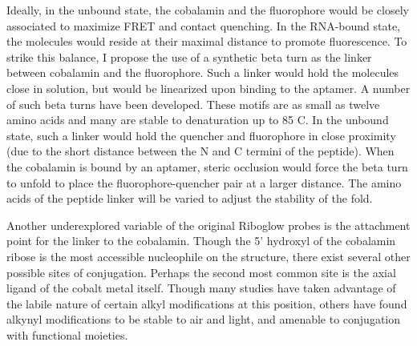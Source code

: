 Ideally, in the unbound state, the cobalamin and the fluorophore would be closely associated to maximize FRET and contact quenching.\cite{LeeDesignSynthesisCharacterization2009} In the RNA-bound state, the molecules would reside at their maximal distance to promote fluorescence. To strike this balance, I propose the use of a synthetic beta turn as the linker between cobalamin and the fluorophore. Such a linker would hold the molecules close in solution, but would be linearized upon binding to the aptamer. A number of such beta turns have been developed. These motifs are as small as twelve amino acids and many are stable to denaturation up to 85 C.\cite{KierProbingLowerSize2008} In the unbound state, such a linker would hold the quencher and fluorophore in close proximity (due to the short distance between the N and C termini of the peptide). When the cobalamin is bound by an aptamer, steric occlusion would force the beta turn to unfold to place the fluorophore-quencher pair at a larger distance. The amino acids of the peptide linker will be varied to adjust the stability of the fold. 

Another underexplored variable of the original Riboglow probes is the attachment point for the linker to the cobalamin. Though the 5' hydroxyl of the cobalamin ribose is the most accessible nucleophile on the structure, there exist several other possible sites of conjugation. Perhaps the second most common site is the axial ligand of the cobalt metal itself. Though many studies have taken advantage of the labile nature of certain alkyl modifications at this position,\cite{ShellVitaminB12Tunable2015} others have found alkynyl modifications to be stable to air and light,\cite{ChrominskiReductionfreesynthesisstable2013,RuetzMarkusPhenylethynylcobalaminLightStable2013} and amenable to conjugation with functional moieties.



